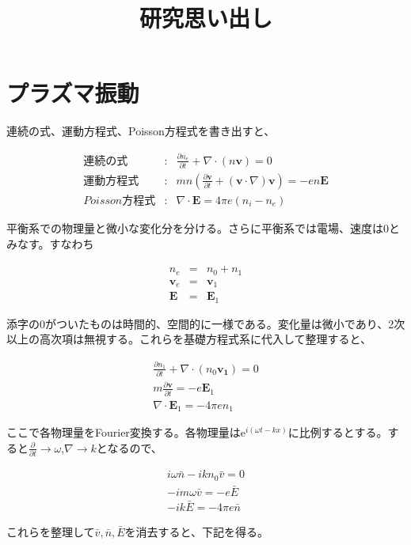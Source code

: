 \documentclass[18pt]{jsarticle}
\title{研究思い出し}
\begin{document}
\section{プラズマ振動}
\par 連続の式、運動方程式、Poisson方程式を書き出すと、

\begin{eqnarray}
    \label{continuous} 連続の式 &:& \frac{\partial n_e}{\partial t} +
        \nabla\cdot (n\bm{v}) = 0 \\
    \label{motion} 運動方程式 &:& mn\left( \frac{\partial \bm{v}}{\partial t}+
      (\bm{v}\cdot\nabla)\bm{v}\right) = -en\bm{E} \\
    \label{poisson} Poisson方程式 &:& \nabla\cdot\bm{E}=4\pi e(n_i-n_e)
\end{eqnarray}

\par 平衡系での物理量と微小な変化分を分ける。さらに平衡系では電場、速度は0とみなす。すなわち

\begin{eqnarray}
    n_e &=& n_0 + n_1 \nonumber \\ 
    \bm{v}_e &=& \bm{v}_1 \nonumber \\
    \bm{E} &=& \bm{E}_1 \nonumber 
\end{eqnarray}

添字の0がついたものは時間的、空間的に一様である。変化量は微小であり、2次以上の高次項は無視する。これらを基礎方程式系に代入して整理すると、

\begin{eqnarray}
    \frac{\partial n_1}{\partial t}+\nabla\cdot(n_0\bm{v_1}) = 0 \\
    m\frac{\partial \bm{v}}{\partial t} = -e\bm{E}_1 \\
    \nabla\cdot\bm{E}_1 = -4\pi en_1
\end{eqnarray}

\par ここで各物理量をFourier変換する。各物理量は$\mathrm{e}^{i(\omega t-kx)}$に比例するとする。すると$\frac{\partial}{\partial t}\rightarrow\omega$,$\nabla\rightarrow k$となるので、

\begin{eqnarray}
    i\omega \bar{n}-ikn_0 \bar{v} = 0 \\
    -im\omega\bar{v} = -e\bar{E} \\
    -ik\bar{E}=-4\pi e\bar{n}
\end{eqnarray}

これらを整理して$\bar{v},\bar{n},\bar{E}$を消去すると、下記を得る。
\end{document}
